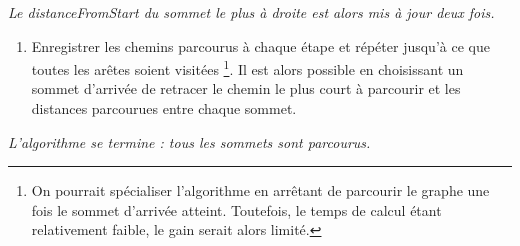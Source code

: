 \documentclass[,french]{article}
\providecommand{\tightlist}{%
  \setlength{\itemsep}{0pt}\setlength{\parskip}{0pt}}
\let\rmarkdownfootnote\footnote%
\def\footnote{\protect\rmarkdownfootnote}
\begin{document}
\begin{adjustwidth}{50pt}{50pt}
\begin{center}
\emph{Le distanceFromStart du sommet le plus à droite est alors mis à jour deux fois.}
\end{center}
\end{adjustwidth}

\begin{enumerate}
\def\labelenumi{\arabic{enumi}.}
\setcounter{enumi}{6}
\tightlist
\item
  Enregistrer les chemins parcourus à chaque étape et répéter jusqu'à ce
  que toutes les arêtes soient visitées \footnote{On pourrait
    spécialiser l'algorithme en arrêtant de parcourir le graphe une fois
    le sommet d'arrivée atteint. Toutefois, le temps de calcul étant
    relativement faible, le gain serait alors limité.}. Il est alors
  possible en choisissant un sommet d'arrivée de retracer le chemin le
  plus court à parcourir et les distances parcourues entre chaque
  sommet.
\end{enumerate}

\begin{center}
\end{center}

\begin{adjustwidth}{50pt}{50pt}
\begin{center}
\emph{L’algorithme se termine : tous les sommets sont parcourus.}
\end{center}
\end{adjustwidth}
\end{document}
